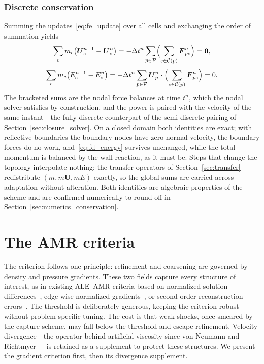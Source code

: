 \documentclass[a4paper]{cas-sc}
\begin{document}
\subsubsection{Discrete conservation}

Summing the updates~\eqref{eq:fe_update} over all cells and exchanging the order of summation yields
\begin{equation}
	\sum_c m_c\bigl(\boldsymbol U_c^{n+1}-\boldsymbol U_c^n\bigr)
	=-\Delta t^n\sum_{p\in\mathcal P}\Bigl(\sum_{c\in\mathcal C(p)}\boldsymbol F_{pc}^n\Bigr)=\boldsymbol 0,
	\label{eq:fd_mom}
\end{equation}
\begin{equation}
	\sum_c m_c\bigl(E_c^{n+1}-E_c^n\bigr)
	=-\Delta t^n\sum_{p\in\mathcal P}\boldsymbol U_p^n\cdot\Bigl(\sum_{c\in\mathcal C(p)}\boldsymbol F_{pc}^n\Bigr)=0.
	\label{eq:fd_energy}
\end{equation}
The bracketed sums are the nodal force balances at time $t^n$, which the nodal solver satisfies by construction, and the power is paired with the velocity of the same instant---the fully discrete counterpart of the semi-discrete pairing of Section~\ref{sec:closure_solver}. On a closed domain both identities are exact; with reflective boundaries the boundary nodes have zero normal velocity, the boundary forces do no work, and~\eqref{eq:fd_energy} survives unchanged, while the total momentum is balanced by the wall reaction, as it must be. Steps that change the topology interpolate nothing: the transfer operators of Section~\ref{sec:transfer} redistribute $(m,m\boldsymbol U,mE)$ exactly, so the global sums are carried across adaptation without alteration. Both identities are algebraic properties of the scheme and are confirmed numerically to round-off in Section~\ref{sec:numerics_conservation}.

\section{The AMR criteria}
\label{sec:indicator}

The criterion follows one principle: refinement and coarsening are governed by density and pressure gradients. These two fields capture every structure of interest, as in existing ALE--AMR criteria based on normalized solution differences~\cite{anderson2004arbitrary,morrell2007cell}, edge-wise normalized gradients~\cite{waltz2018coupled}, or second-order reconstruction errors~\cite{colaitis2026cell}. The threshold is deliberately generous, keeping the criterion robust without problem-specific tuning. The cost is that weak shocks, once smeared by the capture scheme, may fall below the threshold and escape refinement. Velocity divergence---the operator behind artificial viscosity since von Neumann and Richtmyer~\cite{vonneumann1950method}---is retained as a supplement to protect these structures. We present the gradient criterion first, then its divergence supplement.
\end{document}
